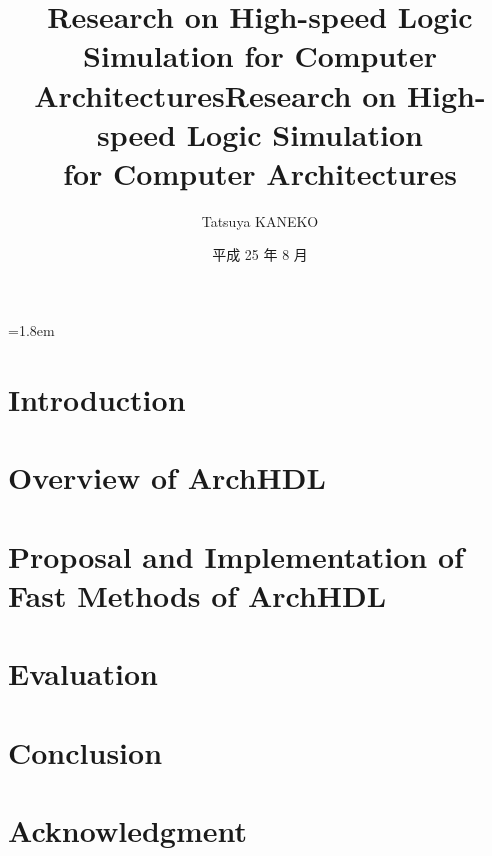 \documentclass[12pt,openany,papersize,english]{jsbook}
\title{Research on High-speed Logic Simulation for Computer Architectures}
\affiliation{Department of Computer Science}
\title{Research on High-speed Logic Simulation \\ for Computer Architectures}
\author{Tatsuya KANEKO}
\date{平成 25 年 8 月}
\begin{document}
\maketitle
\parindent=1.8em
\frontmatter

\tableofcontents

\mainmatter

\chapter{Introduction}




% 

\chapter{Overview of ArchHDL}

\label{c:summary}



\chapter{Proposal and Implementation of Fast Methods of ArchHDL}

\label{c:method}



\chapter{Evaluation}

\label{c:evaluation}



\chapter{Conclusion}

\label{c:conclusion}



\backmatter

\chapter{Acknowledgment}

\label{c:acknowledgment}



\label{c:relatedwork}


\end{document}
